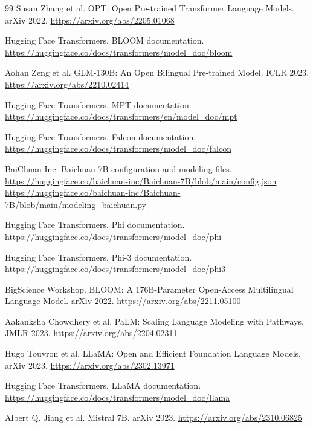 \documentclass[UTF8,a4paper,11pt]{ctexart}
\begin{document}
\begin{thebibliography}{99}
Susan Zhang et al.
\newblock OPT: Open Pre-trained Transformer Language Models.
\newblock arXiv 2022.
\newblock \url{https://arxiv.org/abs/2205.01068}

Hugging Face Transformers.
\newblock BLOOM documentation.
\newblock \url{https://huggingface.co/docs/transformers/model_doc/bloom}

Aohan Zeng et al.
\newblock GLM-130B: An Open Bilingual Pre-trained Model.
\newblock ICLR 2023.
\newblock \url{https://arxiv.org/abs/2210.02414}

Hugging Face Transformers.
\newblock MPT documentation.
\newblock \url{https://huggingface.co/docs/transformers/en/model_doc/mpt}

Hugging Face Transformers.
\newblock Falcon documentation.
\newblock \url{https://huggingface.co/docs/transformers/model_doc/falcon}

BaiChuan-Inc.
\newblock Baichuan-7B configuration and modeling files.
\newblock \url{https://huggingface.co/baichuan-inc/Baichuan-7B/blob/main/config.json}
\newblock \url{https://huggingface.co/baichuan-inc/Baichuan-7B/blob/main/modeling_baichuan.py}

Hugging Face Transformers.
\newblock Phi documentation.
\newblock \url{https://huggingface.co/docs/transformers/model_doc/phi}

Hugging Face Transformers.
\newblock Phi-3 documentation.
\newblock \url{https://huggingface.co/docs/transformers/model_doc/phi3}

BigScience Workshop.
\newblock BLOOM: A 176B-Parameter Open-Access Multilingual Language Model.
\newblock arXiv 2022.
\newblock \url{https://arxiv.org/abs/2211.05100}

Aakanksha Chowdhery et al.
\newblock PaLM: Scaling Language Modeling with Pathways.
\newblock JMLR 2023.
\newblock \url{https://arxiv.org/abs/2204.02311}

Hugo Touvron et al.
\newblock LLaMA: Open and Efficient Foundation Language Models.
\newblock arXiv 2023.
\newblock \url{https://arxiv.org/abs/2302.13971}

Hugging Face Transformers.
\newblock LLaMA documentation.
\newblock \url{https://huggingface.co/docs/transformers/model_doc/llama}

Albert Q. Jiang et al.
\newblock Mistral 7B.
\newblock arXiv 2023.
\newblock \url{https://arxiv.org/abs/2310.06825}


\end{thebibliography}
\end{document}
